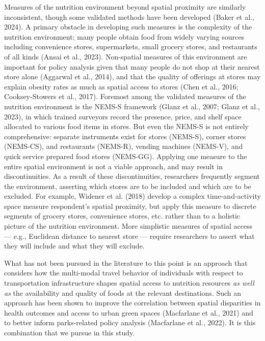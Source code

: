 \documentclass[
  letterpaper,
  number,
  review,
  3p]{elsarticle}
\begin{document}
Measures of the nutrition environment beyond spatial proximity are
similarly inconsistent, though some validated methods have been
developed (Baker et al., 2024). A primary obstacle in developing such
measures is the complexity of the nutrition environment; many people
obtain food from widely varying sources including convenience stores,
supermarkets, small grocery stores, and restaurants of all kinds (Ansai
et al., 2023). Non-spatial measures of this environment are important
for policy analysis given that many people do not shop at their nearest
store alone (Aggarwal et al., 2014), and that the quality of offerings
at stores may explain obesity rates as much as spatial access to stores
(Chen et al., 2016; Cooksey-Stowers et al., 2017). Foremost among the
validated measures of the nutrition environment is the NEMS-S framework
(Glanz et al., 2007; Glanz et al., 2023), in which trained surveyors
record the presence, price, and shelf space allocated to various food
items in stores. But even the NEMS-S is not entirely comprehensive:
separate instruments exist for stores (NEMS-S), corner stores (NEMS-CS),
and restaurants (NEMS-R), vending machines (NEMS-V), and quick service
prepared food stores (NEMS-GG). Applying one measure to the entire
spatial environment is not a viable approach, and may result in
discontinuities. As a result of these discontinuities, researchers
frequently segment the environment, asserting which stores are to be
included and which are to be excluded. For example, Widener et al.
(2018) develop a complex time-and-activity space measure respondent's
spatial proximity, but apply this measure to discrete segments of
grocery stores, convenience stores, etc. rather than to a holistic
picture of the nutrition environment. More simplistic measures of
spatial access --- e.g., Euclidean distance to nearest store --- require
researchers to assert what they will include and what they will exclude.

What has not been pursued in the literature to this point is an approach
that considers how the multi-modal travel behavior of individuals with
respect to transportation infrastructure shapes spatial access to
nutrition resources \emph{as well as} the availability and quality of
foods at the relevant destinations. Such an approach has been shown to
improve the correlation between spatial disparities in health outcomes
and access to urban green spaces (Macfarlane et al., 2021) and to better
inform parks-related policy analysis (Macfarlane et al., 2022). It is
this combination that we pursue in this study.
\end{document}
